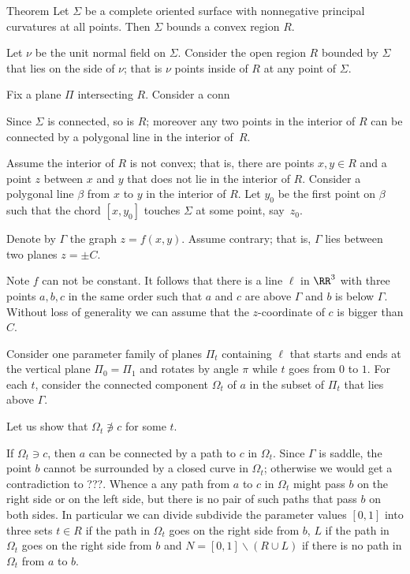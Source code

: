 \begin{thm}{Theorem}
Let $\Sigma$ be a complete oriented surface with 
nonnegative principal curvatures at all points.
Then $\Sigma$ bounds a convex region $R$.
\end{thm}

Let $\nu$ be the unit normal field on $\Sigma$.
Consider the open region $R$ bounded by $\Sigma$ that lies on the side of $\nu$;
that is $\nu$ points inside of $R$ at any point of $\Sigma$.

Fix a plane $\Pi$ intersecting $R$.
Consider a conn

Since $\Sigma$ is connected, so is $R$;
moreover any two points in the interior of $R$ can be connected by a polygonal line in the interior of~$R$.

Assume the interior of $R$ is not convex; that is, there are points $x,y\in R$ and a point $z$ between $x$ and $y$ that does not lie in the interior of $R$.
Consider a polygonal  line $\beta$ from $x$ to $y$ in the interior of $R$.
Let $y_0$ be the first point on $\beta$ such that the chord $[x,y_0]$ touches $\Sigma$ at some point, say~$z_0$.

\qeds












Denote by $\Gamma$ the graph $z=f(x,y)$.
Assume contrary; that is, $\Gamma$ lies between two planes $z=\pm C$.

Note $f$ can not be constant.
It follows that there is a line $\ell$ in $\RR^3$ with three points $a,b,c$ in the same order such that 
$a$ and $c$ are above $\Gamma$ and $b$ is below $\Gamma$.
Without loss of generality we can assume that the $z$-coordinate of $c$ is bigger than $C$.

Consider one parameter family of planes $\Pi_t$ containing $\ell$ that starts and ends at the vertical plane $\Pi_0=\Pi_1$ and rotates by angle $\pi$ while $t$ goes from $0$ to $1$.
For each $t$, consider the connected component $\Omega_t$ of $a$ in the subset of $\Pi_t$ that lies above $\Gamma$.

Let us show that $\Omega_t\not\ni c$ for some $t$.

If  $\Omega_t\ni c$, then $a$ can be connected by a path to $c$ in $\Omega_t$.
Since $\Gamma$ is saddle, the point $b$ cannot be surrounded by a closed curve in $\Omega_t$;
otherwise we would get a contradiction to ???.
Whence a any path from $a$ to $c$ in $\Omega_t$ might pass $b$ on the right side or on the left side,
but there is no pair of such paths that pass $b$ on both sides.
In particular we can divide subdivide the parameter values $[0,1]$ into three sets $t\in R$ if the path  in $\Omega_t$  goes on the right side from $b$,  $L$ if the path in $\Omega_t$ goes on the right side from $b$ and $N=[0,1]\backslash(R\cup L)$ if there is no path in $\Omega_t$ from $a$ to $b$.

